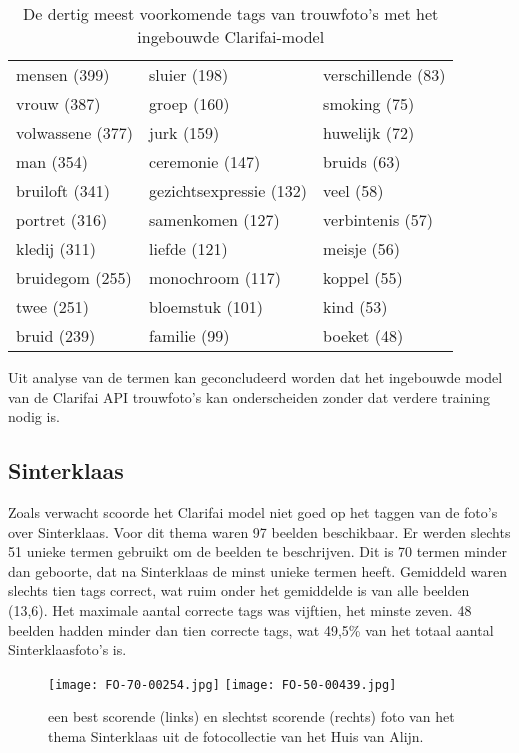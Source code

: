 \begin{table}
	\centering
	\begin{tabular}{*{3}{l}}
		mensen (399) & sluier (198) & verschillende (83) \\
		vrouw (387) & groep (160) & smoking (75) \\
		volwassene (377) & jurk (159) & huwelijk (72) \\
		man (354) & ceremonie (147) & bruids (63) \\
		bruiloft (341) & gezichtsexpressie (132) & veel (58) \\
		portret (316) & samenkomen (127) & verbintenis (57) \\
		kledij (311) & liefde (121) & meisje (56) \\
		bruidegom (255) & monochroom (117) & koppel (55) \\
		twee (251) & bloemstuk (101) & kind (53) \\
		bruid (239) & familie (99) & boeket (48) \\	
	\end{tabular}
	\caption{De dertig meest voorkomende tags van trouwfoto's met het ingebouwde Clarifai-model}
	\label{tab:30-termen-huwelijk}
\end{table}

Uit analyse van de termen kan geconcludeerd worden dat het ingebouwde model van de Clarifai API trouwfoto’s kan onderscheiden zonder dat verdere training nodig is.

\subsection{Sinterklaas}

Zoals verwacht scoorde het Clarifai model niet goed op het taggen van de foto’s over Sinterklaas. Voor dit thema waren 97 beelden beschikbaar. Er werden slechts 51 unieke termen gebruikt om de beelden te beschrijven. Dit is 70 termen minder dan geboorte, dat na Sinterklaas de minst unieke termen heeft. Gemiddeld waren slechts tien tags correct, wat ruim onder het gemiddelde is van alle beelden (13,6). Het maximale aantal correcte tags was vijftien, het minste zeven. 48 beelden hadden minder dan tien correcte tags, wat 49,5\% van het totaal aantal Sinterklaasfoto’s is.

\begin{figure}
	\centering
	\texttt{[image: FO-70-00254.jpg]}\hfill
	\texttt{[image: FO-50-00439.jpg]}\hfill
	\caption[Best en slechtst scorende foto van thema Sinterklaas]{een best scorende (links) en slechtst scorende (rechts) foto van het thema Sinterklaas uit de fotocollectie van het Huis van Alijn.}
\end{figure}

